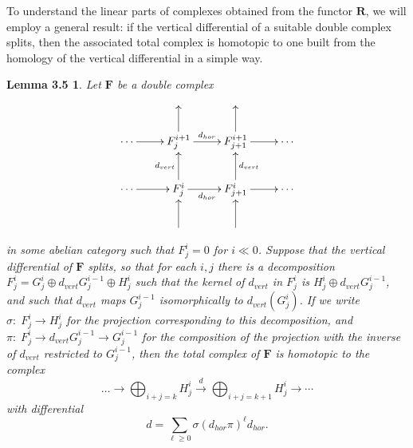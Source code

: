 \documentclass{tran-l}
\newcommand{\FF}{\mathbf{F}}
\newcommand{\RR}{\mathbf{R}}
\theoremstyle{plain}
\newtheorem*{theorem13}{Lemma 3.5}
\theoremstyle{remark}
\theoremstyle{definition}
\begin{document}
To understand the linear parts of complexes obtained from
the functor $\RR $, we will
employ a general result:
if the vertical differential of a suitable double complex splits,
then the associated total complex is homotopic to one built from
the homology of the vertical differential in a simple way.
\begin{theorem13}
Let $\FF $ be a double complex
\begin{equation*}\xy \xymatrix {
&&\\
\dotsb \ar [r]&F^{i+1}_{j}\ar [u]\ar [r]^{d_{hor}}&F^{i+1}_{j+1}\ar [r]\ar [u]&\dotsb \\
\dotsb \ar [r]&F^{i}_{j}\ar [u]^{d_{vert}}\ar [r]_{d_{hor}}&F_{j+1}^{i}\ar [r]
\ar [u]_{d_{vert}}&\dotsb \\
{}&{}\ar [u]&{}\ar [u]&\\
}
\endxy \end{equation*}
in some abelian category such that $F^{i}_{j}=0$ for $i\ll 0$.
Suppose that the vertical differential of $\FF $ splits, so that for
each $i,j$
there is a decomposition
$F^{i}_{j}=G^{i}_{j}\oplus d_{vert}G^{i-1}_{j}\oplus H^{i}_{j}$
such that the kernel of $d_{vert}$ in $F^{i}_{j}$ is
$H^{i}_{j}\oplus d_{vert}G^{i-1}_{j}$,
and such that $d_{vert}$ maps $G^{i-1}_{j}$ isomorphically to
$d_{vert}(G^{i}_{j})$.
If we write $\sigma :\; F^{i}_{j}\to H^{i}_{j}$ for the projection corresponding
to this decomposition, and
$\pi :\; F^{i}_{j}\to d_{vert}G^{i-1}_{j}\to G^{i-1}_{j}$
for the composition of the projection with the inverse of
$d_{vert}$ restricted to $G^{i-1}_{j}$, then the total complex of $\FF $ is
homotopic to the complex
\begin{equation*}\dots \to \bigoplus _{i+j=k}H^{i}_{j}\overset {d}{\longrightarrow }
\bigoplus _{i+j=k+1}H^{i}_{j}
\to \cdots \end{equation*}
with differential
\begin{equation*}d=\sum _{\ell \geq 0}\sigma (d_{hor} \pi )^{\ell }d_{hor}.
\end{equation*}
\end{theorem13}
\end{document}
